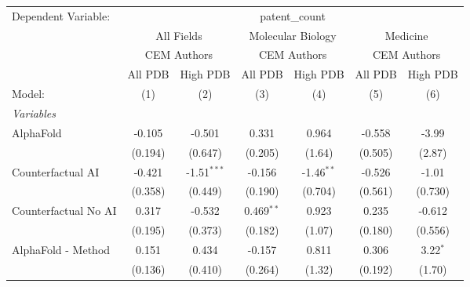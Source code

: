 \begingroup
\centering
\begin{tabular}{lcccccc}
   \tabularnewline \midrule \midrule
   Dependent Variable: & \multicolumn{6}{c}{patent\_count}\\
 & \multicolumn{2}{c}{All Fields} & \multicolumn{2}{c}{Molecular Biology} & \multicolumn{2}{c}{Medicine} \\
\cmidrule(lr){2-3} \cmidrule(lr){4-5} \cmidrule(lr){6-7}
 & \multicolumn{2}{c}{CEM Authors} & \multicolumn{2}{c}{CEM Authors} & \multicolumn{2}{c}{CEM Authors} \\
\cmidrule(lr){2-3} \cmidrule(lr){4-5} \cmidrule(lr){6-7}
 & \multicolumn{1}{c}{All PDB} & \multicolumn{1}{c}{High PDB} & \multicolumn{1}{c}{All PDB} & \multicolumn{1}{c}{High PDB} & \multicolumn{1}{c}{All PDB} & \multicolumn{1}{c}{High PDB} \\
\cmidrule(lr){2-2} \cmidrule(lr){3-3} \cmidrule(lr){4-4} \cmidrule(lr){5-5} \cmidrule(lr){6-6} \cmidrule(lr){7-7}
   Model:                                                     & (1)     & (2)           & (3)          & (4)           & (5)          & (6)\\  
   \midrule
   \emph{Variables}\\
   AlphaFold                                                  & -0.105  & -0.501        & 0.331        & 0.964         & -0.558       & -3.99\\   
                                                              & (0.194) & (0.647)       & (0.205)      & (1.64)        & (0.505)      & (2.87)\\   
   Counterfactual AI                                          & -0.421  & -1.51$^{***}$ & -0.156       & -1.46$^{**}$  & -0.526       & -1.01\\   
                                                              & (0.358) & (0.449)       & (0.190)      & (0.704)       & (0.561)      & (0.730)\\   
   Counterfactual No AI                                       & 0.317   & -0.532        & 0.469$^{**}$ & 0.923         & 0.235        & -0.612\\   
                                                              & (0.195) & (0.373)       & (0.182)      & (1.07)        & (0.180)      & (0.556)\\   
   AlphaFold - Method                                         & 0.151   & 0.434         & -0.157       & 0.811         & 0.306        & 3.22$^{*}$\\   
                                                              & (0.136) & (0.410)       & (0.264)      & (1.32)        & (0.192)      & (1.70)\\   

\end{tabular}
